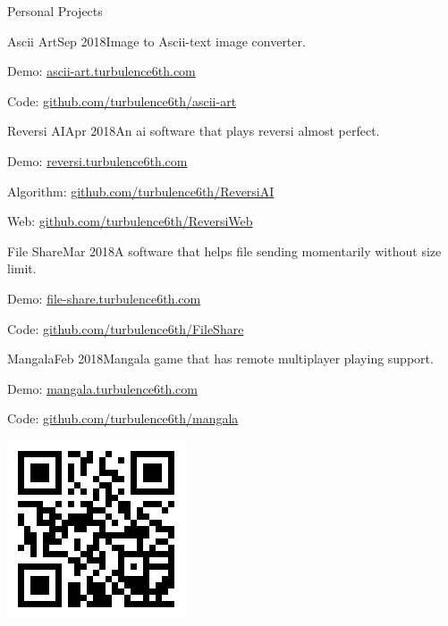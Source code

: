 \documentclass{resume} %
\begin{document}
\begin{rSection}{Personal Projects}

\begin{rSubsection}{Ascii Art}{Sep 2018}{Image to Ascii-text image converter.}{}
\item Demo: \href{http://ascii-art.turbulence6th.com}{ascii-art.turbulence6th.com}
\item Code: \href{https://github.com/turbulence6th/ascii-art}{github.com/turbulence6th/ascii-art}
\end{rSubsection}

\begin{rSubsection}{Reversi AI}{Apr 2018}{An ai software that plays reversi almost perfect.}{}
\item Demo: \href{http://reversi.turbulence6th.com}{reversi.turbulence6th.com}
\item Algorithm: \href{https://github.com/turbulence6th/ReversiAI}{github.com/turbulence6th/ReversiAI}
\item Web: \href{https://github.com/turbulence6th/ReversiWeb}{github.com/turbulence6th/ReversiWeb}
\end{rSubsection}

\begin{rSubsection}{File Share}{Mar 2018}{A software that helps file sending momentarily without size limit.}{}
\item Demo: \href{http://file-share.turbulence6th.com}{file-share.turbulence6th.com}
\item Code: \href{https://github.com/turbulence6th/FileShare}{github.com/turbulence6th/FileShare}
\end{rSubsection}

\begin{rSubsection}{Mangala}{Feb 2018}{Mangala game that has remote multiplayer playing support.}{}
\item Demo: \href{http://mangala.turbulence6th.com}{mangala.turbulence6th.com}
\item Code: \href{https://github.com/turbulence6th/mangala}{github.com/turbulence6th/mangala}
\end{rSubsection}

\end{rSection}

\begin{flushright}
\includegraphics[scale=0.35]{qr_cv.png}
\end{flushright}
\end{document}
